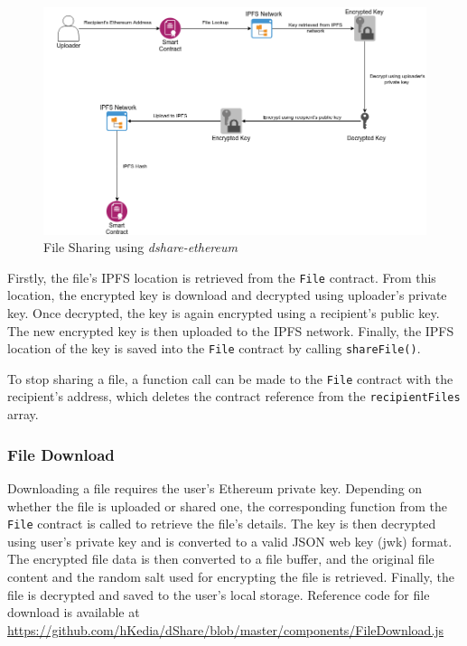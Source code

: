 \begin{figure}[h]
	\includegraphics[width=\linewidth]{figures/ethereum-share}
	\caption{\label{fig:ethereum-share} File Sharing using \textit{dshare-ethereum}}
\end{figure}

Firstly, the file's IPFS location is retrieved from the \texttt{File} contract. From this location, the encrypted key is download and decrypted using uploader's private key. Once decrypted, the key is again encrypted using a recipient's public key. The new encrypted key is then uploaded to the IPFS network. Finally, the IPFS location of the key is saved into the \texttt{File} contract by calling \texttt{shareFile()}.

To stop sharing a file, a function call can be made to the \texttt{File} contract with the recipient's address, which deletes the contract reference from the \texttt{recipientFiles} array.

\subsubsection{File Download}
Downloading a file requires the user's Ethereum private key. Depending on whether the file is uploaded or shared one, the corresponding function from the \texttt{File} contract is called to retrieve the file's details. The key is then decrypted using user's private key and is converted to a valid JSON web key (jwk) \cite{rfc7517} format. The encrypted file data is then converted to a file buffer, and the original file content and the random salt used for encrypting the file is retrieved. Finally, the file is decrypted and saved to the user's local storage. Reference code for file download is available at \url{https://github.com/hKedia/dShare/blob/master/components/FileDownload.js}

